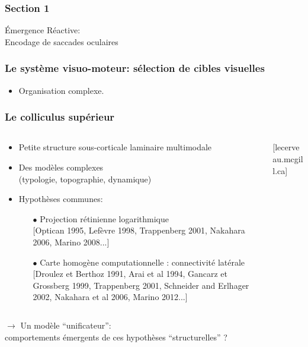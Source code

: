 \documentclass[10pt]{beamer}
\begin{document}
\begin{frame}
  \frametitle{Section 1}
\begin{center}
{{\color{blue}\'Emergence R\'eactive:}\\
Encodage de saccades oculaires }
\end{center}
\end{frame}
\begin{frame}
  \frametitle{Le syst\`eme visuo-moteur: s\'election de cibles visuelles}
\begin{itemize}
\item Organisation complexe. 
\end{itemize}
\end{frame}
\begin{frame}
  \frametitle{Le colliculus sup\'erieur}
\begin{columns}
\begin{column}{0.7\textwidth}
\begin{itemize}
\item Petite structure sous-corticale laminaire multimodale
\item Des mod\`eles complexes\\ (typologie, topographie, dynamique)
\item Hypoth\`eses communes:
\begin{itemize}
\item[$\bullet$] {\color{blue} Projection r\'etinienne logarithmique}\\
\small{[Optican 1995, Lef\`evre 1998, Trappenberg 2001, Nakahara 2006, Marino 2008...]}
\item[$\bullet$] {\color{blue}Carte homog\`ene computationnelle : connectivit\'e lat\'erale}\\
\small{[Droulez et Berthoz 1991, Arai et al 1994, Gancarz et Grossberg 1999, Trappenberg 2001, Schneider and Erlhager 2002, Nakahara et al 2006, Marino 2012...]}
\end{itemize}
\end{itemize}
\end{column}
\begin{column}{0.4\textwidth}
\begin{flushright}{\footnotesize [lecerveau.mcgill.ca]}\end{flushright}
\end{column}
\end{columns}
\vspace{0.5cm}
$\to$ Un mod\`ele ``unificateur'':\\ {\color{purple} comportements \'emergents de ces hypoth\`eses ``structurelles'' ?}
\end{frame}
\end{document}

